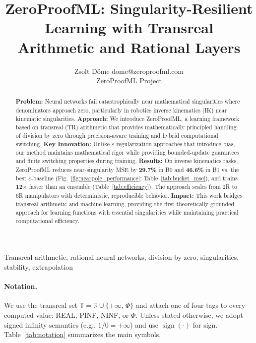 \documentclass[twoside,11pt]{article}
\newcommand{\TR}{\mathbb{T}}
\newcommand{\RR}{\mathbb{R}}
\newcommand{\trReal}{\textsc{REAL}}
\newcommand{\trPINF}{\textsc{PINF}}
\newcommand{\trNINF}{\textsc{NINF}}
\newcommand{\trPHI}{\textsc{$\Phi$}}
\newcommand{\TAGREAL}{\trReal}
\newcommand{\TAGPINF}{\trPINF}
\newcommand{\TAGNINF}{\trNINF}
\newcommand{\TAGPHI}{\trPHI}
\DeclareMathOperator{\sign}{sign}
\begin{document}
\title{ZeroProofML: Singularity-Resilient Learning with Transreal Arithmetic and Rational Layers}

\author{
       \name Zsolt D{\"o}me \email dome@zeroproofml.com \\
       \addr ZeroProofML Project
}

\editor{}

\maketitle

\begin{abstract}
\textbf{Problem:} Neural networks fail catastrophically near mathematical singularities where denominators approach zero, particularly in robotics inverse kinematics (IK) near kinematic singularities.
\textbf{Approach:} We introduce ZeroProofML, a learning framework based on transreal (TR) arithmetic that provides mathematically principled handling of division by zero through precision-aware training and hybrid computational switching.
\textbf{Key Innovation:} Unlike $\varepsilon$-regularization approaches that introduce bias, our method maintains mathematical rigor while providing bounded-update guarantees and finite switching properties during training.
\textbf{Results:} On inverse kinematics tasks, ZeroProofML reduces near-singularity MSE by \textbf{29.7\%} in B0 and \textbf{46.6\%} in B1 vs. the best $\varepsilon$-baseline (Fig.~\ref{fig:nearpole_performance}; Table~\ref{tab:bucket_mse}), and trains \textbf{12$\times$} faster than an ensemble (Table~\ref{tab:efficiency}). The approach scales from 2R to 6R manipulators with deterministic, reproducible behavior.
\textbf{Impact:} This work bridges transreal arithmetic and machine learning, providing the first theoretically grounded approach for learning functions with essential singularities while maintaining practical computational efficiency.
\end{abstract}

\begin{keywords}
Transreal arithmetic, rational neural networks, division-by-zero, singularities, stability, extrapolation
\end{keywords}

\paragraph{Notation.} We use the transreal set $\TR = \RR \cup \{\pm\infty,\,\Phi\}$ and attach one of four tags to every computed value: \TAGREAL, \TAGPINF, \TAGNINF, or \TAGPHI. Unless stated otherwise, we adopt signed infinity semantics (e.g., $1/0=+\infty$) and use $\sign(\cdot)$ for sign. Table~\ref{tab:notation} summarizes the main symbols.
\end{document}
